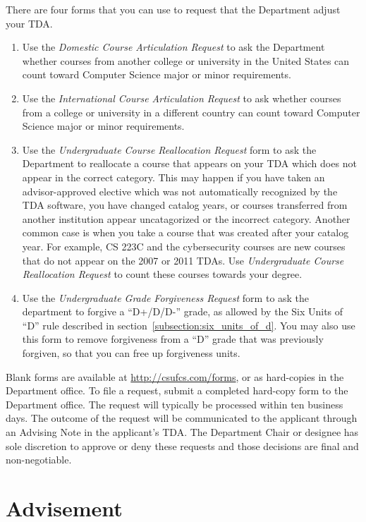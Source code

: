 \documentclass{book}
\newcommand{\shrunkurl}[1]{\url{http://csufcs.com/#1}}
\begin{document}
There are four forms that you can use to request that the Department
adjust your TDA.
\begin{enumerate}
  \item Use the \emph{Domestic Course Articulation Request} to ask the
    Department whether courses from another college or university in
    the United States can count toward Computer Science major or minor
    requirements.
  \item Use the \emph{International Course Articulation Request} to
    ask whether courses from a college or university in a different
    country can count toward Computer Science major or minor
    requirements.
  \item Use the \emph{Undergraduate Course Reallocation Request} form
    to ask the Department to reallocate a course that appears on your
    TDA which does not appear in the correct category. This may happen
    if you have taken an advisor-approved elective which was not
    automatically recognized by the TDA software, you have changed
    catalog years, or courses transferred from another institution
    appear uncatagorized or the incorrect category.
    Another common case is when you take a course that was created after your catalog year. For example, CS 223C and the cybersecurity courses are new courses that do not appear on the 2007 or 2011 TDAs. Use \emph{Undergraduate Course Reallocation Request} to count these courses towards your degree.
  \item Use the \emph{Undergraduate Grade Forgiveness Request} form to
    ask the department to forgive a ``D+/D/D-'' grade, as allowed by
    the Six Units of ``D'' rule described in
    section~\ref{subsection:six_units_of_d}. You may also use this
    form to remove forgiveness from a ``D'' grade that was previously
    forgiven, so that you can free up forgiveness units.
\end{enumerate}

Blank forms are available at \shrunkurl{forms}, or as hard-copies in the Department office. To file a request, submit a completed hard-copy form to the Department office. The request will typically be processed within ten business days. The outcome of the request will be communicated to the applicant through an Advising Note in the applicant’s TDA. The Department Chair or designee has sole discretion to approve or deny these requests and those decisions are final and non-negotiable.

\chapter{Advisement}
\end{document}
